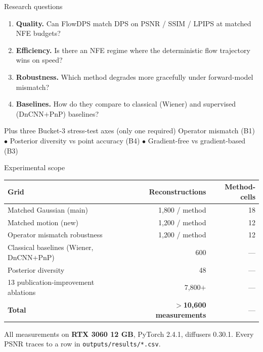 \documentclass[10pt,aspectratio=169]{beamer}
\begin{document}
\begin{frame}{Research questions}
  \begin{enumerate}
    \item \textbf{Quality.} Can FlowDPS match DPS on PSNR / SSIM / LPIPS at
          matched NFE budgets?
    \item \textbf{Efficiency.} Is there an NFE regime where the deterministic
          flow trajectory wins on speed?
    \item \textbf{Robustness.} Which method degrades more gracefully under
          forward-model mismatch?
    \item \textbf{Baselines.} How do they compare to classical (Wiener) and
          supervised (DnCNN$+$PnP) baselines?
  \end{enumerate}

  \vspace{0.5em}
  \begin{block}{Plus three Bucket-3 stress-test axes (only one required)}
    Operator mismatch (B1) $\bullet$ Posterior diversity vs point
    accuracy (B4) $\bullet$ Gradient-free vs gradient-based (B3)
  \end{block}

\end{frame}

\begin{frame}{Experimental scope}
  \begin{table}
    \centering
    \begin{tabular}{lrr}
      \toprule
      Grid & Reconstructions & Method-cells \\
      \midrule
      Matched Gaussian (main) & 1{,}800 / method & 18 \\
      Matched motion (new) & 1{,}200 / method & 12 \\
      Operator mismatch robustness & 1{,}200 / method & 12 \\
      Classical baselines (Wiener, DnCNN$+$PnP) & 600 & --- \\
      Posterior diversity & 48 & --- \\
      13 publication-improvement ablations & 7{,}800$+$ & --- \\
      \midrule
      \textbf{Total} & \textbf{$>$10{,}600 measurements} & --- \\
      \bottomrule
    \end{tabular}
  \end{table}

  All measurements on \textbf{RTX 3060 12 GB}, PyTorch 2.4.1, diffusers
  0.30.1. Every PSNR traces to a row in \texttt{outputs/results/*.csv}.

\end{frame}
\end{document}
